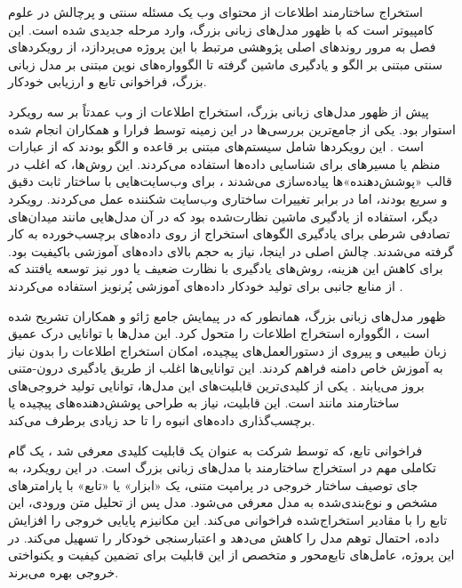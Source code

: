 

استخراج ساختارمند اطلاعات از محتوای وب یک مسئله سنتی و پرچالش در علوم کامپیوتر است که با ظهور مدل‌های زبانی بزرگ، وارد مرحله جدیدی شده است. این فصل به مرور روندهای اصلی پژوهشی مرتبط با این پروژه می‌پردازد، از رویکردهای سنتی مبتنی بر الگو و یادگیری ماشین گرفته تا الگوواره‌های نوین مبتنی بر مدل زبانی بزرگ، فراخوانی تابع و ارزیابی خودکار.


پیش از ظهور مدل‌های زبانی بزرگ، استخراج اطلاعات از وب عمدتاً بر سه رویکرد استوار بود. یکی از جامع‌ترین بررسی‌ها در این زمینه توسط فرارا و همکاران انجام شده است \cite{ferrara2014web}. این رویکردها شامل سیستم‌های مبتنی بر قاعده و الگو بودند که از عبارات منظم یا مسیرهای  برای شناسایی داده‌ها استفاده می‌کردند. این روش‌ها، که اغلب در قالب «پوشش‌دهنده»ها پیاده‌سازی می‌شدند \cite{kushmerick1997wrapper}، برای وب‌سایت‌هایی با ساختار ثابت دقیق و سریع بودند، اما در برابر تغییرات ساختاری وب‌سایت شکننده عمل می‌کردند. رویکرد دیگر، استفاده از یادگیری ماشین نظارت‌شده بود که در آن مدل‌هایی مانند میدان‌های تصادفی شرطی \cite{lafferty2001conditional} برای یادگیری الگوهای استخراج از روی داده‌های برچسب‌خورده به کار گرفته می‌شدند. چالش اصلی در اینجا، نیاز به حجم بالای داده‌های آموزشی باکیفیت بود. برای کاهش این هزینه، روش‌های یادگیری با نظارت ضعیف یا دور نیز توسعه یافتند که از منابع جانبی برای تولید خودکار داده‌های آموزشی پُرنویز استفاده می‌کردند \cite{mintz2009distant}.


ظهور مدل‌های زبانی بزرگ، همانطور که در پیمایش جامع ژائو و همکاران تشریح شده است \cite{zhao2023survey}، الگوواره استخراج اطلاعات را متحول کرد. این مدل‌ها با توانایی درک عمیق زبان طبیعی و پیروی از دستورالعمل‌های پیچیده، امکان استخراج اطلاعات را بدون نیاز به آموزش خاص دامنه فراهم کردند. این توانایی‌ها اغلب از طریق یادگیری درون-متنی بروز می‌یابند \cite{arora2023survey}. یکی از کلیدی‌ترین قابلیت‌های این مدل‌ها، توانایی تولید خروجی‌های ساختارمند مانند  است. این قابلیت، نیاز به طراحی پوشش‌دهنده‌های پیچیده یا برچسب‌گذاری داده‌های انبوه را تا حد زیادی برطرف می‌کند.


فراخوانی تابع، که توسط شرکت  به عنوان یک قابلیت کلیدی معرفی شد \cite{open2023function}، یک گام تکاملی مهم در استخراج ساختارمند با مدل‌های زبانی بزرگ است. در این رویکرد، به جای توصیف ساختار خروجی در پرامپت متنی، یک «ابزار» یا «تابع» با پارامترهای مشخص و نوع‌بندی‌شده به مدل معرفی می‌شود. مدل پس از تحلیل متن ورودی، این تابع را با مقادیر استخراج‌شده فراخوانی می‌کند. این مکانیزم پایایی خروجی را افزایش داده، احتمال توهم مدل را کاهش می‌دهد و اعتبارسنجی خودکار را تسهیل می‌کند. در این پروژه، عامل‌های تابع‌محور و متخصص از این قابلیت برای تضمین کیفیت و یکنواختی خروجی بهره می‌برند.


